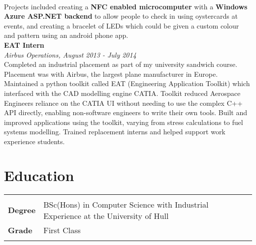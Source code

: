 \documentclass{article}
\begin{document}
\begin{flushleft}
\paragraph{}Projects included creating a \textbf{NFC enabled microcomputer} with a \textbf{Windows Azure ASP.NET backend} to allow people to check in using oystercards at events, and creating a bracelet of LEDs which could be given a custom colour and pattern using an android phone app. \\[10pt]

\textbf{EAT Intern}\\
\textit{Airbus Operations, August 2013 - July 2014}\\[5pt]
Completed an industrial placement as part of my university sandwich course. Placement was with Airbus, the largest plane manufacturer in Europe. Maintained a python toolkit called EAT (Engineering Application Toolkit) which interfaced with the CAD modelling engine CATIA. Toolkit reduced Aerospace Engineers reliance on the CATIA UI without needing to use the complex C++ API directly, enabling non-software engineers to write their own tools. Built and improved applications using the toolkit, varying from stress calculations to fuel systems modelling. Trained replacement interns and helped support work experience students.

\section*{Education}
\begin{tabular}{@{}ll@{}}
    \multicolumn{2}{l}{}\\
    \textbf{Degree} &BSc(Hons) in Computer Science with Industrial Experience at the University of Hull  \\
    \textbf{Grade} &First Class   \\
    &\\
\end{tabular}


\end{flushleft}
\end{document}
